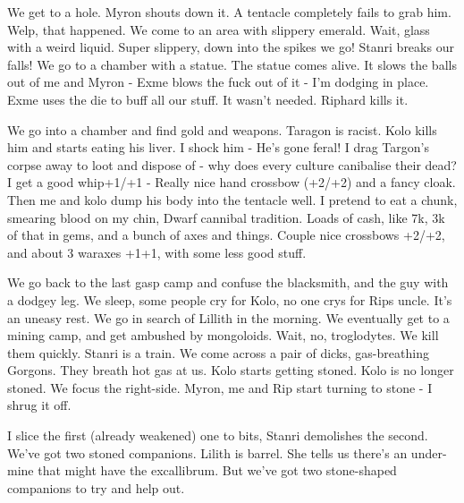 We get to a hole. Myron shouts down it. A tentacle completely fails to grab him. Welp, that happened. We come to an area with slippery emerald. Wait, glass with a weird liquid. Super slippery, down into the spikes we go! Stanri breaks our falls! We go to a chamber with a statue. The statue comes alive. It slows the balls out of me and Myron - Exme blows the fuck out of it - I’m dodging in place. Exme uses the die to buff all our stuff. It wasn’t needed. Riphard kills it.\medskip

We go into a chamber and find gold and weapons. Taragon is racist. Kolo kills him and starts eating his liver. I shock him - He’s gone feral! I drag Targon’s corpse away to loot and dispose of - why does every culture canibalise their dead? I get a good whip+1/+1 - Really nice hand crossbow (+2/+2) and a fancy cloak. Then me and kolo dump his body into the tentacle well. I pretend to eat a chunk, smearing blood on my chin, Dwarf cannibal tradition. Loads of cash, like 7k, 3k of that in gems, and a bunch of axes and things. Couple nice crossbows +2/+2, and about 3 waraxes +1+1, with some less good stuff.\medskip

We go back to the last gasp camp and confuse the blacksmith, and the guy with a dodgey leg. We sleep, some people cry for Kolo, no one crys for Rips uncle. It’s an uneasy rest. We go in search of Lillith in the morning. We eventually get to a mining camp, and get ambushed by mongoloids. Wait, no, troglodytes. We kill them quickly. Stanri is a train. We come across a pair of dicks, gas-breathing Gorgons. They breath hot gas at us. Kolo starts getting stoned. Kolo is no longer stoned. We focus the right-side. Myron, me and Rip start turning to stone - I shrug it off.\medskip

I slice the first (already weakened) one to bits, Stanri demolishes the second. We’ve got two stoned companions. Lilith is barrel. She tells us there’s an under-mine that might have the excallibrum. But we’ve got two stone-shaped companions to try and help out.\medskip



%

\clearpage
